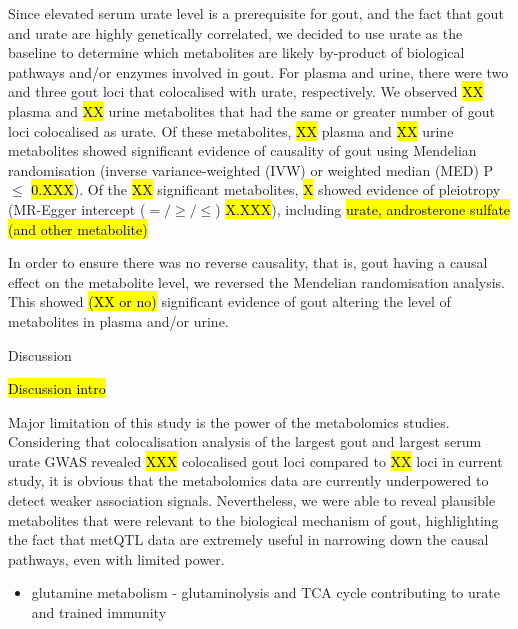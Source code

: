 \documentclass[a4paper,10pt]{article}
\begin{document}
Since elevated serum urate level is a prerequisite for gout, and the fact that gout and urate are highly genetically correlated, we decided to use urate as the baseline to determine which metabolites are likely by-product of biological pathways and/or enzymes involved in gout.
For plasma and urine, there were two and three gout loci that colocalised with urate, respectively.
We observed \hl{XX} plasma and \hl{XX} urine metabolites that had the same or greater number of gout loci colocalised as urate.
Of these metabolites, \hl{XX} plasma and \hl{XX} urine metabolites showed significant evidence of causality of gout using Mendelian randomisation (inverse variance-weighted (IVW) or weighted median (MED) P $\le$ \hl{0.XXX}).
Of the \hl{XX} significant metabolites, \hl{X} showed evidence of pleiotropy (MR-Egger intercept ($=/\ge/\le$) \hl{X.XXX}), including \hl{urate, androsterone sulfate (and other metabolite)}

In order to ensure there was no reverse causality, that is, gout having a causal effect on the metabolite level, we reversed the Mendelian randomisation analysis.
This showed \hl{(XX or no)} significant evidence of gout altering the level of metabolites in plasma and/or urine.


\begin{center}
	\large{Discussion}
\end{center}

\noindent
\hl{Discussion intro}

Major limitation of this study is the power of the metabolomics studies.
Considering that colocalisation analysis of the largest gout and largest serum urate GWAS revealed \hl{XXX} colocalised gout loci compared to \hl{XX} loci in current study, it is obvious that the metabolomics data are currently underpowered to detect weaker association signals.
Nevertheless, we were able to reveal plausible metabolites that were relevant to the biological mechanism of gout, highlighting the fact that metQTL data are extremely useful in narrowing down the causal pathways, even with limited power.

\begin{itemize}
	\item glutamine metabolism - glutaminolysis and TCA cycle contributing to urate and trained immunity
\end{itemize}



% 

\end{document}
